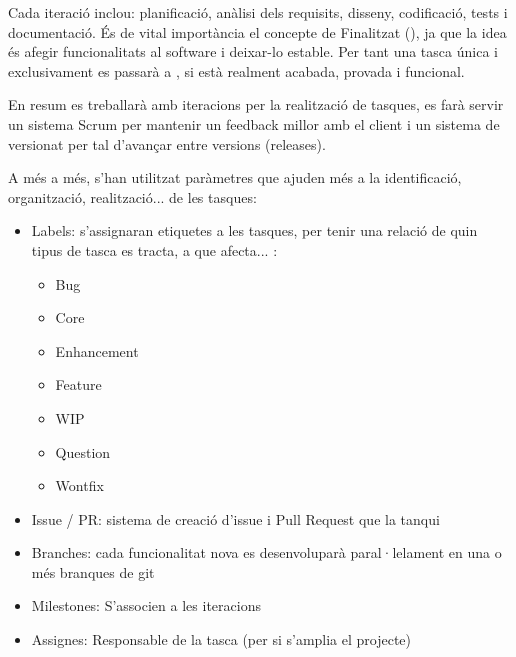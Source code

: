 \documentclass[letterpaper,11pt,catalan]{sphinxmanual}
\begin{document}
Cada iteració inclou: planificació, anàlisi dels requisits, disseny, codificació, tests
i documentació. És de vital importància el concepte de \sphinxquotedblleft{}Finalitzat\sphinxquotedblright{} (), ja que
la idea és afegir funcionalitats al software i deixar-lo estable.
Per tant una tasca única i exclusivament es passarà a , si està realment
acabada, provada i funcional.

En resum es treballarà amb iteracions per la realització de tasques, es farà servir
un sistema Scrum per mantenir un feedback millor amb el client i un sistema de versionat
per tal d'avançar entre versions (releases).

A més a més, s'han utilitzat paràmetres que ajuden més a la identificació, organització,
realització... de les tasques:
\begin{itemize}
\item {} 
Labels: s'assignaran etiquetes a les tasques, per tenir una relació de quin tipus de tasca es tracta, a que afecta... :
\begin{itemize}
\item {} 
Bug

\item {} 
Core

\item {} 
Enhancement

\item {} 
Feature

\item {} 
WIP

\item {} 
Question

\item {} 
Wontfix

\end{itemize}

\item {} 
Issue / PR: sistema de creació d'issue i Pull Request que la tanqui

\item {} 
Branches: cada funcionalitat nova es desenvoluparà paral·lelament en una o més branques de git

\item {} 
Milestones: S'associen a les iteracions

\item {} 
Assignes: Responsable de la tasca (per si s'amplia el projecte)

\end{itemize}
\end{document}
